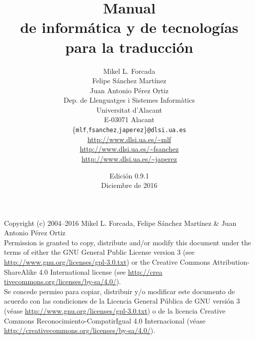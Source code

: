 \documentclass[11pt,a4paper]{book}
\begin{document}
 \frontmatter

\title{\bf Manual \\ de informática y de tecnologías\\ para la traducción} 

\author{Mikel L. Forcada\\Felipe Sánchez Martínez\\Juan Antonio Pérez Ortiz\\[2ex] Dep. de Llenguatges i Sistemes Informàtics\\ Universitat d'Alacant\\ E-03071 Alacant\\[2ex] \{\texttt{mlf},\texttt{fsanchez},\texttt{japerez}\}\texttt{@dlsi.ua.es} \\[2ex] \url{http://www.dlsi.ua.es/~mlf} \\ \url{http://www.dlsi.ua.es/~fsanchez} \\ \url{http://www.dlsi.ua.es/~japerez} }
\date{Edición
0.9.1\\ Diciembre de 2016} \maketitle

\newpage

\noindent Copyright (c) 2004--2016 Mikel L. Forcada, Felipe Sánchez Martínez \& Juan Antonio Pérez Ortiz \\[0.3cm] 

\noindent Permission is granted to copy, distribute and/or modify this document under the terms of either the GNU General Public License version 3 (see \url{http://www.gnu.org/licenses/gpl-3.0.txt}) or the Creative Commons Attribution-ShareAlike 4.0 International license (see \url{http://crea} \url{tivecommons.org/licenses/by-sa/4.0/}). \\[0.3cm] 

\noindent Se concede permiso para copiar, distribuir y/o modificar este documento de acuerdo con las condiciones de la Licencia General Pública de GNU versión 3 (véase \url{http://www.gnu.org/licenses/gpl-3.0.txt}) o de la licencia Creative Commons Reconocimiento-CompatirIgual 4.0 Internacional (véase \url{http://creativecommons.org/licenses/by-sa/4.0/}). 

\maketitle
\end{document}
